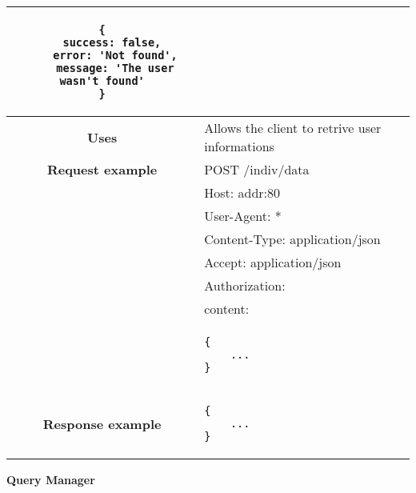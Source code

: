 \begin{adjustwidth}{1cm}{}
\begin{longtable}{|c|l|}
\begin{minipage}[t]{0.7\textwidth}
                \begin{adjustwidth}{1.5cm}{}
                \begin{verbatim}
{
    success: false, 
    error: 'Not found',
    message: 'The user wasn't found'
}
                \end{verbatim}
                \end{adjustwidth}
              \end{minipage} \\
              \hline
            \textbf{Uses} & Allows the client to retrive user informations \\
            \hline
               \textbf{Request example}
             & POST /indiv/data \\
             & Host: addr:80\\
             & User-Agent: * \\
             & Content-Type: application/json\\
             & Accept: application/json\\
             & Authorization: \\
             & content: \\
            & \begin{minipage}[t]{0.5\textwidth}
                \begin{adjustwidth}{1.5cm}{}
                \begin{verbatim}
{
    ...
}
                \end{verbatim}
                \end{adjustwidth}
              \end{minipage} \\
            \hline
             \textbf{Response example} & 
              \begin{minipage}[t]{0.5\textwidth}
                \begin{adjustwidth}{1.5cm}{}
                \begin{verbatim}
{
    ...
}
                \end{verbatim}
                \end{adjustwidth}
              \end{minipage} \\
              \hline
       
        \end{longtable}
    \end{adjustwidth}
   \textbf{Query Manager}
    

